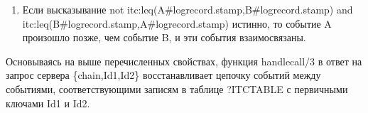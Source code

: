 {\begin{enumerate}
\item Если высказывание not itc:leq(A\#log\underline{\hspace{0.25cm}}record.stamp,B\#log\underline{\hspace{0.25cm}}record.stamp) and itc:leq(B\#log\underline{\hspace{0.25cm}}record.stamp,A\#log\underline{\hspace{0.25cm}}record.stamp) истинно, то событие A произошло позже, чем событие B, и эти события взаимосвязаны. 
\end{enumerate}\par
Основываясь на выше перечисленных свойствах, функция handle\underline{\hspace{0.25cm}}call/3 в ответ на запрос сервера \{chain,Id\underline{\hspace{0.25cm}}1,Id\underline{\hspace{0.25cm}}2\} восстанавливает цепочку событий между событиями, соответствующими записям в таблице ?ITC\underline{\hspace{0.25cm}}TABLE с первичными ключами Id\underline{\hspace{0.25cm}}1 и Id\underline{\hspace{0.25cm}}2.
}
